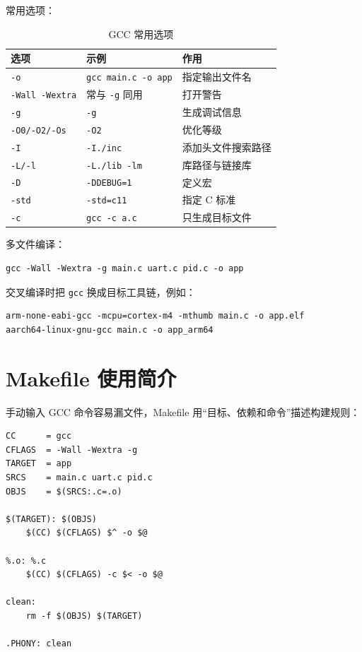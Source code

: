 常用选项：

\begin{table}[htbp]
\centering \small \caption{GCC 常用选项} \label{tab:gcc-option}
    \begin{tabular}{lll}
        \toprule
        \textbf{选项} & \textbf{示例} & \textbf{作用} \\
        \midrule
        \texttt{-o} & \texttt{gcc main.c -o app} & 指定输出文件名 \\
        \texttt{-Wall -Wextra} & 常与 \texttt{-g} 同用 & 打开警告 \\
        \texttt{-g} & \texttt{-g} & 生成调试信息 \\
        \texttt{-O0/-O2/-Os} & \texttt{-O2} & 优化等级 \\
        \texttt{-I} & \texttt{-I./inc} & 添加头文件搜索路径 \\
        \texttt{-L/-l} & \texttt{-L./lib -lm} & 库路径与链接库 \\
        \texttt{-D} & \texttt{-DDEBUG=1} & 定义宏 \\
        \texttt{-std} & \texttt{-std=c11} & 指定 C 标准 \\
        \texttt{-c} & \texttt{gcc -c a.c} & 只生成目标文件 \\
        \bottomrule
    \end{tabular}
\end{table}

多文件编译：

\begin{lstlisting}
gcc -Wall -Wextra -g main.c uart.c pid.c -o app
\end{lstlisting}

交叉编译时把 \texttt{gcc} 换成目标工具链，例如：

\begin{lstlisting}
arm-none-eabi-gcc -mcpu=cortex-m4 -mthumb main.c -o app.elf
aarch64-linux-gnu-gcc main.c -o app_arm64
\end{lstlisting}

\section{Makefile 使用简介}

手动输入 GCC 命令容易漏文件，Makefile 用“目标、依赖和命令”描述构建规则：

\begin{lstlisting}
CC      = gcc
CFLAGS  = -Wall -Wextra -g
TARGET  = app
SRCS    = main.c uart.c pid.c
OBJS    = $(SRCS:.c=.o)

$(TARGET): $(OBJS)
	$(CC) $(CFLAGS) $^ -o $@

%.o: %.c
	$(CC) $(CFLAGS) -c $< -o $@

clean:
	rm -f $(OBJS) $(TARGET)

.PHONY: clean
\end{lstlisting}


